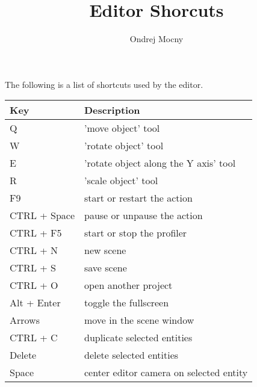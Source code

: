 \documentclass[a4paper, 12pt]{report}
\begin{document}
\pagestyle{empty} %

\title{Editor Shorcuts}
\author{Ondrej Mocny}

\pagestyle{plain} %

The following is a list of shortcuts used by the editor.

\begin{tabular}{|p{0.20\hsize}|p{0.7\hsize}|}
  \hline
  Key & Description \\
	\hline
	Q & 'move object' tool \\
	W & 'rotate object' tool \\
	E & 'rotate object along the Y axis' tool \\
	R & 'scale object' tool \\
	\hline
	F9 & start or restart the action \\
	CTRL + Space & pause or unpause the action \\
	\hline
	CTRL + F5 & start or stop the profiler \\
	CTRL + N & new scene \\
	CTRL + S & save scene \\
	CTRL + O & open another project \\
	Alt + Enter & toggle the fullscreen \\
	\hline
	Arrows & move in the scene window \\
	CTRL + C & duplicate selected entities \\
	Delete & delete selected entities \\
	Space & center editor camera on selected entity \\
	\hline
\end{tabular}
\end{document}

